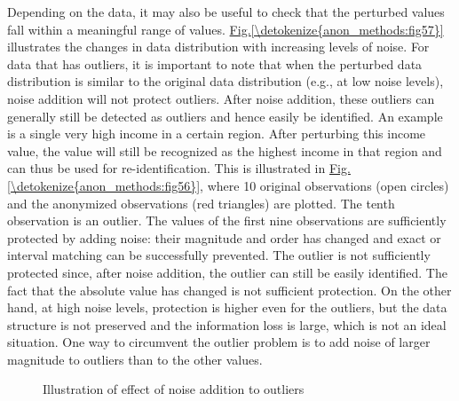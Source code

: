 \documentclass[letterpaper,10pt,english]{sphinxmanual}
\begin{document}
Depending on the data, it may also be useful to check that the perturbed
values fall within a meaningful range of values. \hyperref[\detokenize{anon_methods:fig57}]{Fig.\@ \ref{\detokenize{anon_methods:fig57}}}
illustrates the changes in data distribution with increasing levels of
noise. For data that has outliers, it is important to note that when the
perturbed data distribution is similar to the original data distribution
(e.g., at low noise levels), noise addition will not protect outliers.
After noise addition, these outliers can generally still be detected as
outliers and hence easily be identified. An example is a single very
high income in a certain region. After perturbing this income value, the
value will still be recognized as the highest income in that region and
can thus be used for re-identification. This is illustrated in \hyperref[\detokenize{anon_methods:fig56}]{Fig.\@ \ref{\detokenize{anon_methods:fig56}}},
where 10 original observations (open circles) and the anonymized
observations (red triangles) are plotted. The tenth observation is an
outlier. The values of the first nine observations are sufficiently
protected by adding noise: their magnitude and order has changed and
exact or interval matching can be successfully prevented. The outlier is
not sufficiently protected since, after noise addition, the outlier can
still be easily identified. The fact that the absolute value has changed
is not sufficient protection. On the other hand, at high noise levels,
protection is higher even for the outliers, but the data structure is
not preserved and the information loss is large, which is not an ideal
situation. One way to circumvent the outlier problem is to add noise of
larger magnitude to outliers than to the other values.

\begin{figure}[htbp]
\centering
\capstart

\noindent{}
\caption{Illustration of effect of noise addition to outliers}\label{\detokenize{anon_methods:fig56}}\label{\detokenize{anon_methods:id43}}\end{figure}
\end{document}
